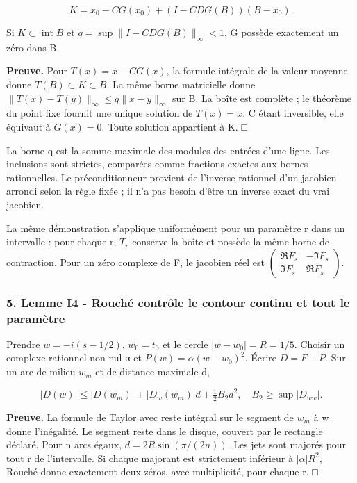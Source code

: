 \documentclass[
  10pt,
  a4paper,
]{article}
\begin{document}
\[
K=x_0-CG(x_0)+(I-CDG(B))(B-x_0).
\]

Si \(K\subset\operatorname{int}B\) et \(q=\sup\|I-CDG(B)\|_\infty<1\), G
possède exactement un zéro dans B.

\textbf{Preuve.} Pour \(T(x)=x-CG(x)\), la formule intégrale de la
valeur moyenne donne \(T(B)\subset K\subset B\). La même borne
matricielle donne \(\|T(x)-T(y)\|_\infty\le q\|x-y\|_\infty\) sur B. La
boîte est complète ; le théorème du point fixe fournit une unique
solution de \(T(x)=x\). C étant inversible, elle équivaut à \(G(x)=0\).
Toute solution appartient à K. □

La borne q est la somme maximale des modules des entrées d'une ligne.
Les inclusions sont strictes, comparées comme fractions exactes aux
bornes rationnelles. Le préconditionneur provient de l'inverse rationnel
d'un jacobien arrondi selon la règle fixée ; il n'a pas besoin d'être un
inverse exact du vrai jacobien.

La même démonstration s'applique uniformément pour un paramètre r dans
un intervalle : pour chaque r, \(T_r\) conserve la boîte et possède la
même borne de contraction. Pour un zéro complexe de F, le jacobien réel
est \(\begin{pmatrix}\Re F_s&-\Im F_s\\\Im F_s&\Re F_s\end{pmatrix}\).

\hypertarget{lemme-i4---rouchuxe9-contruxf4le-le-contour-continu-et-tout-le-paramuxe8tre}{%
\subsubsection{5. Lemme I4 - Rouché contrôle le contour continu et tout
le
paramètre}\label{lemme-i4---rouchuxe9-contruxf4le-le-contour-continu-et-tout-le-paramuxe8tre}}

Prendre \(w=-i(s-1/2)\), \(w_0=t_0\) et le cercle \(|w-w_0|=R=1/5\).
Choisir un complexe rationnel non nul α et \(P(w)=\alpha(w-w_0)^2\).
Écrire \(D=F-P\). Sur un arc de milieu \(w_m\) et de distance maximale
d,

\[
|D(w)|\le |D(w_m)|+|D_w(w_m)|d+\tfrac12 B_2d^2,
\quad B_2\ge\sup|D_{ww}|.
\]

\textbf{Preuve.} La formule de Taylor avec reste intégral sur le segment
de \(w_m\) à w donne l'inégalité. Le segment reste dans le disque,
couvert par le rectangle déclaré. Pour n arcs égaux,
\(d=2R\sin(\pi/(2n))\). Les jets sont majorés pour tout r de
l'intervalle. Si chaque majorant est strictement inférieur à
\(|\alpha|R^2\), Rouché donne exactement deux zéros, avec multiplicité,
pour chaque r. □
\end{document}

